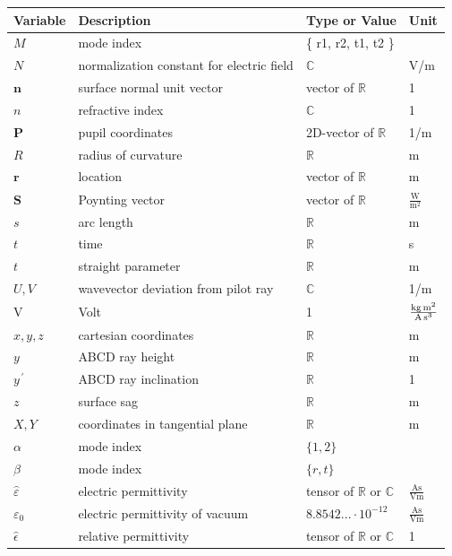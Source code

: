 \documentclass[12pt,a4paper,twoside,openright,BCOR10mm,headsepline,titlepage,abstracton,chapterprefix,final]{scrreprt}
\newcommand\Vector[1]{{\mathbf{#1}}}
\newcommand\vacuum{0}
\newcommand\Tensor[1]{\hat{#1}}
\newcommand\permittivity{\Tensor{\scalarpermittivity}}
\newcommand\vacuumpermittivity{\scalarpermittivity_{\vacuum}}
\newcommand\scalarrelativepermittivity{\epsilon}
\newcommand\relativepermittivity{\Tensor{\scalarrelativepermittivity}}
\newcommand\scalarpermittivity{\varepsilon}
\newcommand\meter{\textrm{m}}
\newcommand\second{\textrm{s}}
\newcommand\ampere{\textrm{A}}
\newcommand\volt{\textrm{V}}
\newcommand\watt{\textrm{W}}
\begin{document}
\begin{tabular}{l|l|l|l}
 Variable & Description & Type or Value & Unit \\
 \hline
 $M$ & mode index &\{ r1, r2, t1, t2 \}&\\
 \hline
 $N$ & normalization constant for electric field & $\mathbb{C}$ & \volt /\meter \\
 \hline
 $\Vector{n}$ & surface normal unit vector & vector of $\mathbb{R}$ & 1\\
 $n$ & refractive index & $\mathbb{C}$ & 1\\
 \hline
 $\Vector{P}$ & pupil coordinates & 2D-vector of $\mathbb{R}$ & 1/\meter \\
 \hline
 $R$ & radius of curvature & $\mathbb{R}$ & \meter \\
 $\Vector{r}$ & location & vector of $\mathbb{R}$ & \meter \\
 \hline
 $\Vector{S}$ & Poynting vector & vector of $\mathbb{R}$ & $\frac{\watt}{\meter^2}$\\
 $s$ & arc length & $\mathbb{R}$ & \meter \\
 \hline
 $t$ & time & $\mathbb{R}$ & \second \\
 $t$ & straight parameter & $\mathbb{R}$ & \meter \\
 \hline
 $U,V$ & wavevector deviation from pilot ray & $\mathbb{C}$ & 1/\meter \\
 \volt & Volt & 1 & $\frac{\textrm{kg\,m}^2}{\textrm{A\,s}^3}$ \\
 \hline
 $x,y,z$ & cartesian coordinates & $\mathbb{R}$ & \meter \\
 $y$ & ABCD ray height & $\mathbb{R}$ & \meter \\
 $y^{\,\prime}$ & ABCD ray inclination& $\mathbb{R}$ & 1\\
 $z$ & surface sag & $\mathbb{R}$ & \meter \\
 \hline
 $X,Y$ & coordinates in tangential plane& $\mathbb{R}$ & \meter \\
 \hline
 $\alpha$ & mode index & $\{ 1, 2 \}$ & \\
 \hline 
 $\beta$ & mode index & $\{ r, t \}$ & \\
 \hline
 $\permittivity$ & electric permittivity & tensor of $\mathbb{R}$ or $\mathbb{C}$ & $\frac{\ampere \second}{\volt \meter}$ \\
 $\vacuumpermittivity$ & electric permittivity of vacuum & $8.8542...\cdot 10^{-12}$ & $\frac{\ampere \second}{\volt \meter}$ \\
 $\relativepermittivity$ & relative permittivity & tensor of $\mathbb{R}$ or $\mathbb{C}$ & 1\\

\end{tabular}
\end{document}
